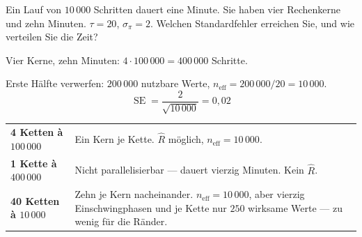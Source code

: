 \begin{aufgabe}
Ein Lauf von $10\,000$ Schritten dauert eine Minute. Sie haben vier Rechenkerne und zehn Minuten. $\tau = 20$, $\sigma_\pi = 2$. Welchen Standardfehler erreichen Sie, und wie verteilen Sie die Zeit?

\loesung
{}
Vier Kerne, zehn Minuten: $4\cdot100\,000 = 400\,000$ Schritte.

Erste Hälfte verwerfen: $200\,000$ nutzbare Werte, $n_{\text{eff}} = 200\,000/20 = 10\,000$.
\[ \operatorname{SE} = \frac{2}{\sqrt{10\,000}} = 0{,}02 \]

\begin{center}
{\small
\renewcommand{\arraystretch}{1.5}
\begin{tabular}{@{}P{3.2cm}P{5.4cm}@{}}
\toprule
\textbf{4 Ketten à $100\,000$} & Ein Kern je Kette. $\hat R$ möglich, $n_{\text{eff}} = 10\,000$.\\
\textbf{1 Kette à $400\,000$} & Nicht parallelisierbar --- dauert vierzig Minuten. Kein $\hat R$.\\
\textbf{40 Ketten à $10\,000$} & Zehn je Kern nacheinander. $n_{\text{eff}} = 10\,000$, aber vierzig Einschwingphasen und je Kette nur $250$ wirksame Werte --- zu wenig für die Ränder.\\
\bottomrule
\end{tabular}}
\end{center}

\begin{center}
\begin{minipage}{0.88\textwidth}
\end{minipage}
\end{center}
\end{aufgabe}

